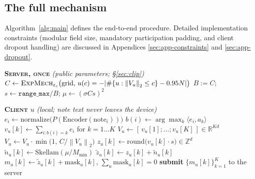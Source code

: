 \documentclass[conference]{IEEEtran}
\theoremstyle{remark}
\newcommand{\eps}{\varepsilon}
\newcommand{\R}{\mathbb{R}}
\newcommand{\Z}{\mathbb{Z}}
\newcommand{\norm}[1]{\left\lVert #1 \right\rVert}
\newcommand{\secref}[1]{\S\ref{#1}}
\begin{document}
\subsection{The full mechanism}\label{sec:algorithm}

Algorithm~\ref{alg:main} defines the end-to-end procedure. Detailed implementation constraints (modular field size, mandatory participation padding, and client dropout handling) are discussed in Appendices \ref{sec:app-constraints} and \ref{sec:app-dropout}.

\begin{algorithm*}[t]
\caption{Private Federated Memory Aggregation (SecAgg $+$ Skellam, vector-only
release). Public/shared parameters are as listed in the text above.}
\label{alg:main}
\footnotesize
\begin{algorithmic}[1]
  \Statex \textbf{\textsc{Server, once}} \hfill \emph{(public parameters; \secref{sec:clip})}
  \State $C \gets \textsc{ExpMech}_{\eps_c}\big(\text{grid},\,
         u(c) = -|\#\{u : \norm{V_u}_2 \leq c\} - 0.95 N|\big)$
  \State $B := C$; \; $s \gets \texttt{range\_max}/B$; \;
         $\mu \gets (\sigma C s)^2$
         \Comment{$|\text{coord}| \leq \norm{V_u}_2 \leq C$}

  \Statex
  \Statex \textbf{\textsc{Client} $u$} \hfill \emph{(local; note text never leaves the device)}
    \State $e_i \gets \mathrm{normalize}\big(P(\mathrm{Encoder}(\text{note}_i))\big)$
    \State $b(i) \gets \arg\max_k \langle e_i, a_k \rangle$
  \EndFor
  \State $v_u[k] \gets \sum_{i : b(i) = k} e_i$ \; for $k = 1 \dots K$
  \State $V_u \gets [\,v_u[1]; \dots; v_u[K]\,] \in \R^{K d}$
  \State $V_u \gets V_u \cdot \min\!\big(1,\, C / \norm{V_u}_2\big)$
         \label{alg:global-clip}
         \Comment{\textbf{global} clip $\Rightarrow \Delta_2 = C s$ (\secref{sec:app-constraints})}
    \State $z_u[k] \gets \mathrm{round}\big(v_u[k] \cdot s\big) \in \Z^{d}$
    \State $\tilde n_u[k] \gets \mathrm{Skellam}(\mu / M_{\min})$
           \label{alg:noise}
    \State $\tilde z_u[k] \gets z_u[k] + \tilde n_u[k]$
    \State $m_u[k] \gets \tilde z_u[k] + \mathrm{mask}_u[k]$, \;
           $\textstyle\sum_u \mathrm{mask}_u[k] = 0$
  \EndFor
  \State \textbf{submit} $\{m_u[k]\}_{k=1}^{K}$ to the server


\end{algorithmic}
\end{algorithm*}
\end{document}
